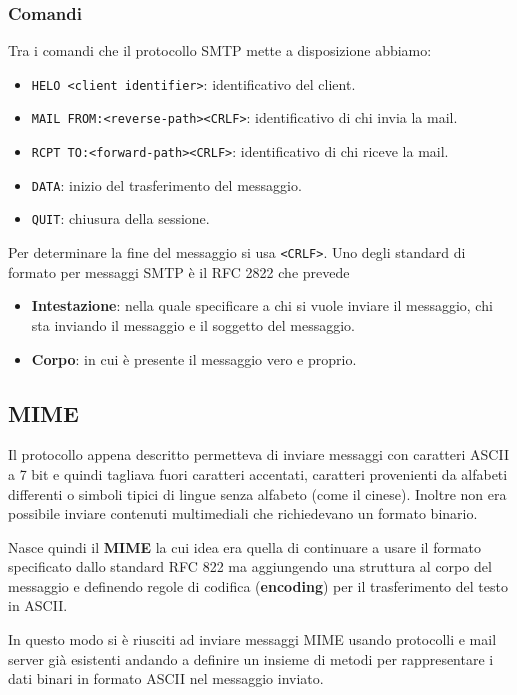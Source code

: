 \subsubsection{Comandi}
Tra i comandi che il protocollo SMTP mette a disposizione abbiamo:
\begin{itemize}
	\item \verb|HELO <client identifier>|: identificativo del client.
	\item \verb|MAIL FROM:<reverse-path><CRLF>|: identificativo di chi invia la mail.
	\item \verb|RCPT TO:<forward-path><CRLF>|: identificativo di chi riceve la mail.
	\item \verb|DATA|: inizio del trasferimento del messaggio.
	\item \verb|QUIT|: chiusura della sessione.
\end{itemize}
Per determinare la fine del messaggio si usa \verb|<CRLF>|. Uno degli standard di formato per
messaggi SMTP è il RFC 2822 che prevede
\begin{itemize}
	\item \textbf{Intestazione}: nella quale specificare a chi si vuole inviare il messaggio, chi
		sta inviando il messaggio e il soggetto del messaggio.
	\item \textbf{Corpo}: in cui è presente il messaggio vero e proprio.
\end{itemize}

\subsection{MIME}
Il protocollo appena descritto permetteva di inviare messaggi con caratteri ASCII a 7 bit e quindi
tagliava fuori caratteri accentati, caratteri provenienti da alfabeti differenti o simboli tipici
di lingue senza alfabeto (come il cinese). Inoltre non era possibile inviare contenuti multimediali
che richiedevano un formato binario.

Nasce quindi il \textbf{MIME} la cui idea era quella di continuare a usare il formato specificato
dallo standard RFC 822 ma aggiungendo una struttura al corpo del messaggio e definendo regole di 
codifica (\textbf{encoding}) per il trasferimento del testo in ASCII.

In questo modo si è riusciti ad inviare messaggi MIME usando protocolli e mail server già esistenti
andando a definire un insieme di metodi per rappresentare i dati binari in formato ASCII nel
messaggio inviato.
